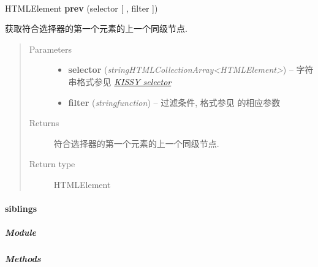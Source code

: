 \documentclass[letterpaper,10pt,english]{sphinxmanual}
\begin{document}
\begin{fulllineitems}
\label{api/core/dom/prev:DOM.prev}~
\begin{DUlineblock}{0em}
\item[] HTMLElement \textbf{prev} (selector {[} , filter {]})
\item[] 获取符合选择器的第一个元素的上一个同级节点.
\end{DUlineblock}
\begin{quote}\begin{description}
\item[{Parameters}] \leavevmode\begin{itemize}
\item {}
\textbf{selector} (\emph{string\textbar{}HTMLCollection\textbar{}Array\textless{}HTMLElement\textgreater{}}) -- 字符串格式参见 {\hyperref[api/core/dom/selector:dom-selector]{\emph{KISSY selector}}}

\item {}
\textbf{filter} (\emph{string\textbar{}function}) -- 过滤条件, 格式参见 {\hyperref[api/core/dom/filter:DOM.filter]{}} 的相应参数

\end{itemize}

\item[{Returns}] \leavevmode
符合选择器的第一个元素的上一个同级节点.

\item[{Return type}] \leavevmode
HTMLElement

\end{description}\end{quote}

\end{fulllineitems}



\paragraph{siblings}
\label{api/core/dom/siblings:siblings}\label{api/core/dom/siblings::doc}

\subparagraph{Module}
\label{api/core/dom/siblings:module}\begin{quote}

{\hyperref[api/core/dom/index:module-DOM]{}}
\end{quote}


\subparagraph{Methods}
\label{api/core/dom/siblings:methods}
\end{document}
